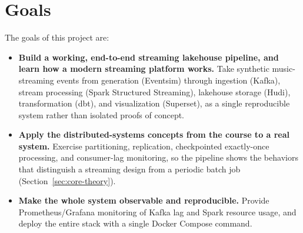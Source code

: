 \section{Goals}

The goals of this project are:

\begin{itemize}
    \item \textbf{Build a working, end-to-end streaming lakehouse pipeline, and learn how a modern streaming platform works.} Take synthetic music-streaming events from generation (Eventsim) through ingestion (Kafka), stream processing (Spark Structured Streaming), lakehouse storage (Hudi), transformation (dbt), and visualization (Superset), as a single reproducible system rather than isolated proofs of concept.
    \item \textbf{Apply the distributed-systems concepts from the course to a real system.} Exercise partitioning, replication, checkpointed exactly-once processing, and consumer-lag monitoring, so the pipeline shows the behaviors that distinguish a streaming design from a periodic batch job (Section~\ref{sec:core-theory}).
    \item \textbf{Make the whole system observable and reproducible.} Provide Prometheus/Grafana monitoring of Kafka lag and Spark resource usage, and deploy the entire stack with a single Docker Compose command.
\end{itemize}
